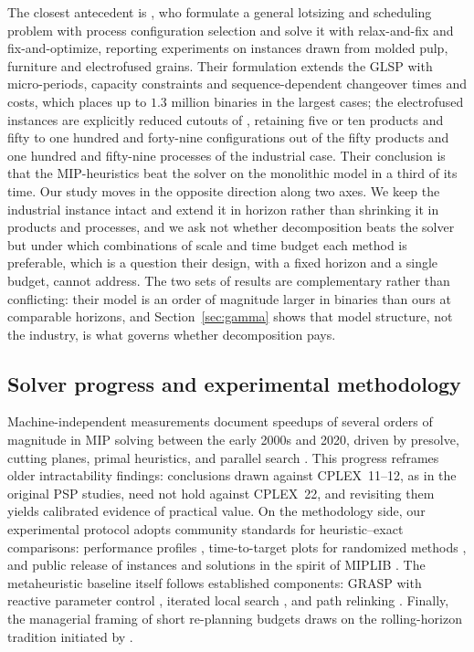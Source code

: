 The closest antecedent is \citet{villasboas2021modeling}, who
formulate a general lotsizing and scheduling problem with process
configuration selection and solve it with relax-and-fix and
fix-and-optimize, reporting experiments on instances drawn from molded
pulp, furniture and electrofused grains. Their formulation extends the
GLSP with micro-periods, capacity constraints and sequence-dependent
changeover times and costs, which places up to $1.3$ million binaries
in the largest cases; the electrofused instances are explicitly
reduced cutouts of \citet{luche2009combining}, retaining five or ten
products and fifty to one hundred and forty-nine configurations out
of the fifty products and one hundred and fifty-nine processes of the
industrial case. Their conclusion is that the MIP-heuristics beat the
solver on the monolithic model in a third of its time. Our study moves
in the opposite direction along two axes. We keep the industrial
instance intact and extend it in horizon rather than shrinking it in
products and processes, and we ask not whether decomposition beats the
solver but under which combinations of scale and time budget each
method is preferable, which is a question their design, with a fixed
horizon and a single budget, cannot address. The two sets of results
are complementary rather than conflicting: their model is an order of
magnitude larger in binaries than ours at comparable horizons, and
Section~\ref{sec:gamma} shows that model structure, not the industry,
is what governs whether decomposition pays.

\subsection{Solver progress and experimental methodology}
\label{sec:rw-methodology}

Machine-independent measurements document speedups of several orders
of magnitude in MIP solving between the early 2000s and 2020, driven
by presolve, cutting planes, primal heuristics, and parallel search
\citep{koch2022progress,achterberg2013analyzing,achterberg2020presolve,bixby2012brief}.
This progress reframes older intractability findings: conclusions
drawn against CPLEX~11--12, as in the original PSP studies, need
not hold against CPLEX~22, and revisiting them yields calibrated
evidence of practical value. On the methodology side, our experimental
protocol adopts community standards for heuristic--exact comparisons:
performance profiles \citep{dolan2002benchmarking}, time-to-target
plots for randomized methods \citep{aiex2007ttt}, and public release
of instances and solutions in the spirit of MIPLIB
\citep{gleixner2021miplib}. The metaheuristic baseline itself follows
established components: GRASP \citep{feo1995greedy} with reactive
parameter control \citep{prais2000reactive}, iterated local search
\citep{lourenco2010iterated}, and path relinking
\citep{laguna1999grasp,resende2016optimization}. Finally, the
managerial framing of short re-planning budgets draws on the
rolling-horizon tradition initiated by \citet{baker1977experimental}.

